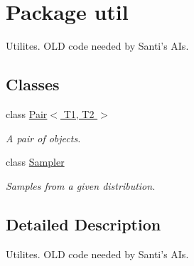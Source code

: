 \hypertarget{namespaceutil}{
\section{Package util}
\label{namespaceutil}
}


Utilites. OLD code needed by Santi's AIs.  


\subsection*{Classes}
\begin{DoxyCompactItemize}
\item 
class \hyperlink{classutil_1_1_pair_3_01_t1_00_01_t2_01_4}{Pair$<$ T1, T2 $>$}
\begin{DoxyCompactList}\small\item\em A pair of objects. \end{DoxyCompactList}\item 
class \hyperlink{classutil_1_1_sampler}{Sampler}
\begin{DoxyCompactList}\small\item\em Samples from a given distribution. \end{DoxyCompactList}\end{DoxyCompactItemize}


\subsection{Detailed Description}
Utilites. OLD code needed by Santi's AIs. 
